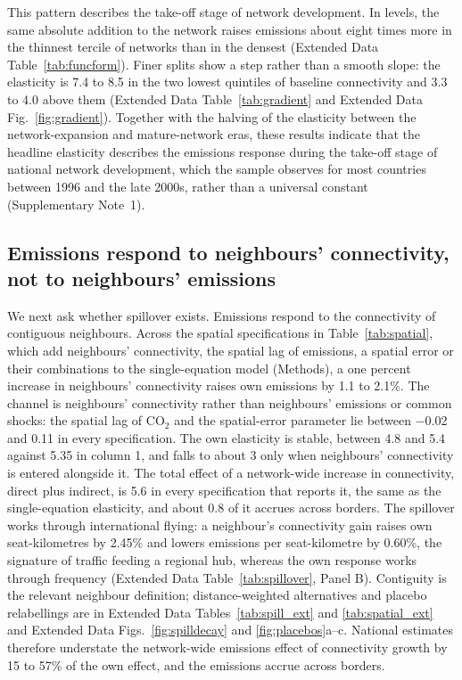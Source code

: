 \documentclass[12pt]{extarticle}
\begin{document}
This pattern describes the take-off stage of network development. In levels, the same absolute addition to the network raises emissions about eight times more in the thinnest tercile of networks than in the densest (Extended Data Table~\ref{tab:funcform}). Finer splits show a step rather than a smooth
slope: the elasticity is 7.4 to 8.5 in the two lowest quintiles of
baseline connectivity and 3.3 to 4.0 above them (Extended Data
Table~\ref{tab:gradient} and Extended Data Fig.~\ref{fig:gradient}).
Together with the halving of the elasticity between the
network-expansion and mature-network eras, these results indicate that
the headline elasticity describes the emissions response during the
take-off stage of national network development, which the sample observes
for most countries between 1996 and the late 2000s, rather than a
universal constant (Supplementary Note~1).

\subsection*{Emissions respond to neighbours' connectivity, not to
neighbours' emissions}

We next ask whether spillover exists. Emissions respond to the connectivity of contiguous neighbours. Across the
spatial specifications in Table~\ref{tab:spatial}, which add neighbours'
connectivity, the spatial lag of emissions, a spatial error or their
combinations to the single-equation model (Methods), a one percent
increase in neighbours' connectivity raises own emissions by 1.1 to 2.1\%. The channel is neighbours' connectivity rather than neighbours'
emissions or common shocks: the spatial lag of CO$_2$ and the
spatial-error parameter lie between $-$0.02 and 0.11 in every
specification. The own elasticity is stable, between 4.8 and 5.4 against
5.35 in column 1, and falls to about 3 only when neighbours' connectivity
is entered alongside it. The total effect of a network-wide increase in
connectivity, direct plus indirect, is 5.6 in every specification that
reports it, the same as the single-equation elasticity, and about 0.8 of
it accrues across borders. The spillover works through international
flying: a neighbour's connectivity gain raises own seat-kilometres by 2.45\% and lowers emissions per seat-kilometre by 0.60\%, the
signature of traffic feeding a regional hub, whereas the own response
works through frequency (Extended Data Table~\ref{tab:spillover}, Panel
B). Contiguity is the relevant neighbour definition; distance-weighted
alternatives and placebo relabellings are in Extended Data
Tables~\ref{tab:spill_ext} and \ref{tab:spatial_ext} and Extended Data
Figs.~\ref{fig:spilldecay} and \ref{fig:placebos}a--c. National estimates
therefore understate the network-wide emissions effect of connectivity
growth by 15 to 57\% of the own effect, and the emissions accrue
across borders.
\end{document}

